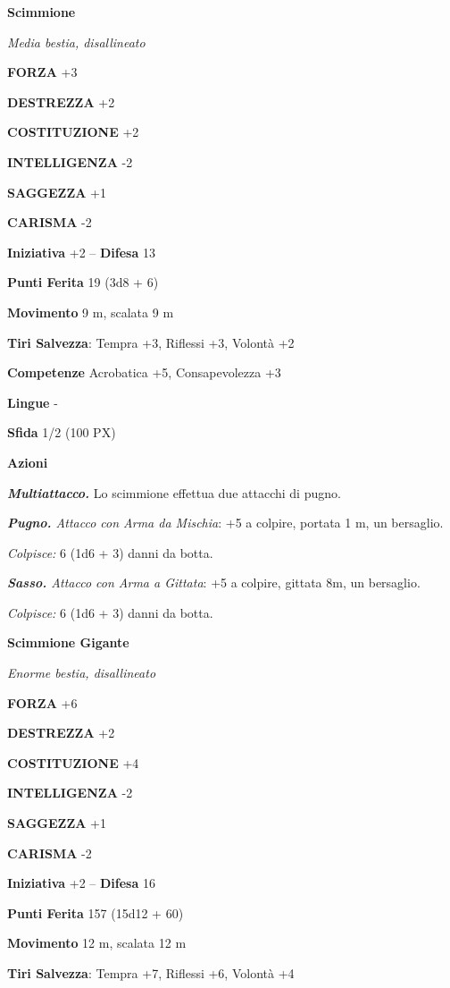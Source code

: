 \begin{multicols}{2}
\medskip\textbf{Scimmione}

\textit{Media bestia, disallineato}

\textbf{FORZA} +3

\textbf{DESTREZZA} +2

\textbf{COSTITUZIONE} +2

\textbf{INTELLIGENZA} -2

\textbf{SAGGEZZA} +1

\textbf{CARISMA} -2

\textbf{Iniziativa} +2 -- \textbf{Difesa} 13

\textbf{Punti Ferita} 19 (3d8 + 6)

\textbf{Movimento} 9 m, scalata 9 m

\textbf{Tiri Salvezza}: Tempra +3, Riflessi +3, Volontà +2

\textbf{Competenze} Acrobatica +5, Consapevolezza +3

\textbf{Lingue} -

\textbf{Sfida} 1/2 (100 PX)

\textbf{Azioni}

\textit{\textbf{Multiattacco.}} Lo scimmione effettua due attacchi di pugno.

\textit{\textbf{Pugno.} Attacco con Arma da Mischia}: +5 a colpire, portata 1 m, un bersaglio.

\textit{Colpisce:} 6 (1d6 + 3) danni da botta.

\textit{\textbf{Sasso.} Attacco con Arma a Gittata}: +5 a colpire, gittata 8m, un bersaglio.

\textit{Colpisce:} 6 (1d6 + 3) danni da botta.

\medskip\textbf{Scimmione Gigante}

\textit{Enorme bestia, disallineato}

\textbf{FORZA} +6

\textbf{DESTREZZA} +2

\textbf{COSTITUZIONE} +4

\textbf{INTELLIGENZA} -2

\textbf{SAGGEZZA} +1

\textbf{CARISMA} -2

\textbf{Iniziativa} +2 -- \textbf{Difesa} 16

\textbf{Punti Ferita} 157 (15d12 + 60)

\textbf{Movimento} 12 m, scalata 12 m

\textbf{Tiri Salvezza}: Tempra +7, Riflessi +6, Volontà +4


\end{multicols}
